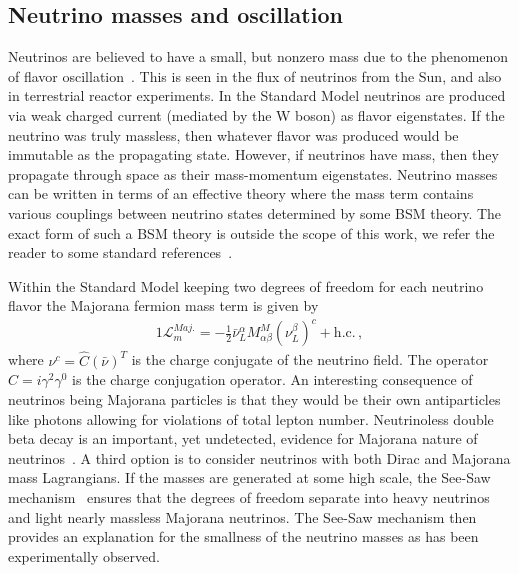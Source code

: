 \documentclass[universe,article,submit,moreauthors,pdftex,a4paper]{Definitions/mdpi}
\newcommand*{\xblue}{\color{blue}}
\begin{document}
\subsection{Neutrino masses and oscillation} \label{sec:Neutrinos}
\noindent Neutrinos are believed to have a small, but nonzero mass due to the phenomenon of flavor oscillation~\cite{SuperKamiokande:1998kpq,KamLAND:2002uet,Fogli:2005cq}. This is seen in the flux of neutrinos from the Sun, and also in terrestrial reactor experiments. In the Standard Model neutrinos are produced via weak charged current (mediated by the W boson) as flavor eigenstates. If the neutrino was truly massless, then whatever flavor was produced would be immutable as the propagating state. However, if neutrinos have mass, then they propagate through space as their mass-momentum eigenstates. 
Neutrino masses can be written in terms of an effective theory where the mass term contains various couplings between neutrino states determined by some BSM theory. The exact form of such a BSM theory is outside the scope of this work, we refer the reader to some standard references~\cite{Giunti:2014ixa,Fritzsch:1999ee,giunti2007fundamentals,Fritzsch:2015gxa}.

{\xblue Within the Standard Model keeping two degrees of freedom for each neutrino flavor the} Majorana fermion mass term is given by
\begin{alignat}{1}
	\label{Majorana} \mathcal{L}_{m}^{Maj.} = -\frac{1}{2}\bar{\nu}^{\alpha}_{L}M^{M}_{\alpha\beta}(\nu^{\beta}_{L})^{c}+\mathrm{h.c.}\,,
\end{alignat}
where $\nu^{c} = \hat{C}(\bar{\nu})^{T}$ is the charge conjugate of the neutrino field. The operator $\hat{C} = i\gamma^{2}\gamma^{0}$ is the charge conjugation operator. {\xblue An interesting consequence of neutrinos being Majorana particles is that they would be their own antiparticles like photons allowing for violations of total lepton number. Neutrinoless double beta decay is an important, yet undetected, evidence for Majorana nature of neutrinos~\cite{Dolinski:2019nrj}.} A third option is to consider neutrinos with both Dirac and Majorana mass Lagrangians. If the masses are generated at some high scale, the See-Saw mechanism~\cite{Arkani-Hamed:1998wuz,Ellis:1999my,Casas:2001sr} ensures that the degrees of freedom separate into heavy neutrinos and light nearly massless Majorana neutrinos. The See-Saw mechanism then provides an explanation for the smallness of the neutrino masses as has been experimentally observed.
\end{document}
